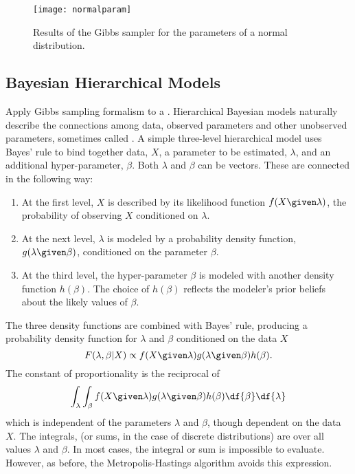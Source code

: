 \documentclass[12pt]{article}
\begin{document}
\begin{figure}
    \centering
    \texttt{[image: normalparam]}
    \caption{Results of the Gibbs sampler for the parameters of a normal
    distribution.}%
    \label{fig:gibbsampler:normalparam}
\end{figure}

\subsection*{Bayesian Hierarchical Models}

Apply Gibbs sampling formalism to a .%
Hierarchical Bayesian models naturally describe the connections among
data, observed parameters and other unobserved parameters, sometimes
called .%
A simple three-level hierarchical model uses Bayes' rule to bind
together data, \( X \), a parameter to be estimated, \( \lambda \), and
an additional hyper-parameter, \( \beta \).  Both \( \lambda \) and \(
\beta \) can be vectors.  These are connected in the following way:
\begin{enumerate}
    \item
        At the first level, \( X \) is described by its likelihood
        function \( f(X \given \lambda) \), the probability of observing
        \( X \) conditioned on \( \lambda \).
    \item
        At the next level, \( \lambda \) is modeled by a probability
        density function, \( g(\lambda \given \beta) \), conditioned on
        the parameter \( \beta \).
    \item
        At the third level, the hyper-parameter \( \beta \) is modeled
        with another density function \( h(\beta) \).  The choice of \(
        h(\beta) \) reflects the modeler's prior beliefs about the
        likely values of \( \beta \).
\end{enumerate}
The three density functions are combined with Bayes' rule, producing a
probability density function for \( \lambda \) and \( \beta \)
conditioned on the data \( X \)
\[
    F(\lambda, \beta | X) \propto f(X \given \lambda) g(\lambda \given
    \beta) h(\beta).
\] The constant of proportionality is the reciprocal of
\[
    \int_{\lambda} \int_{\beta} f(X \given \lambda) g(\lambda \given
    \beta) h(\beta) \df{\beta} \df{\lambda}
\] which is independent of the parameters \( \lambda \) and \( \beta \),
though dependent on the data \( X \).  The integrals, (or sums, in the
case of discrete distributions) are over all values \( \lambda \) and \(
\beta \).  In most cases, the integral or sum is impossible to evaluate.
However, as before, the Metropolis-Hastings algorithm avoids this
expression.
\end{document}
